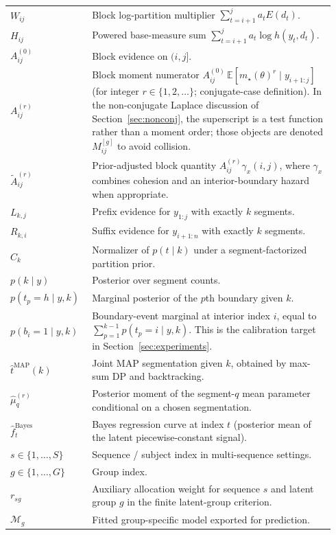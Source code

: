 \begin{longtable}{@{}p{0.22\linewidth}p{0.72\linewidth}@{}}
$W_{ij}$ & Block log-partition multiplier $\sum_{t=i+1}^j a_t E(d_t)$. \\
$H_{ij}$ & Powered base-measure sum $\sum_{t=i+1}^j a_t\log h(y_t,d_t)$. \\
$A^{(0)}_{ij}$ & Block evidence on $(i,j]$. \\
$A^{(r)}_{ij}$ & Block moment numerator $A^{(0)}_{ij}\,\mathbb{E}[m_\star(\theta)^r\mid y_{i+1:j}]$ (for integer $r\in\{1,2,\dots\}$; conjugate-case definition). In the non-conjugate Laplace discussion of Section~\ref{sec:nonconj}, the superscript is a test function rather than a moment order; those objects are denoted $M^{[g]}_{ij}$ to avoid collision. \\
$\widetilde A^{(r)}_{ij}$ & Prior-adjusted block quantity $A^{(r)}_{ij}\gamma_x(i,j)$, where $\gamma_x$ combines cohesion and an interior-boundary hazard when appropriate. \\
\midrule
$L_{k,j}$ & Prefix evidence for $y_{1:j}$ with exactly $k$ segments. \\
$R_{k,i}$ & Suffix evidence for $y_{i+1:n}$ with exactly $k$ segments. \\
$C_k$ & Normalizer of $p(t\mid k)$ under a segment-factorized partition prior. \\
$p(k\mid y)$ & Posterior over segment counts. \\
$p(t_p=h\mid y,k)$ & Marginal posterior of the $p$th boundary given $k$. \\
$p(b_i=1\mid y,k)$ & Boundary-event marginal at interior index $i$, equal to $\sum_{p=1}^{k-1} p(t_p=i\mid y,k)$. This is the calibration target in Section~\ref{sec:experiments}. \\
\midrule
$\widehat t^{\mathrm{MAP}}(k)$ & Joint MAP segmentation given $k$, obtained by max-sum DP and backtracking. \\
$\widehat\mu_q^{(r)}$ & Posterior moment of the segment-$q$ mean parameter conditional on a chosen segmentation. \\
$\widehat f_t^{\mathrm{Bayes}}$ & Bayes regression curve at index $t$ (posterior mean of the latent piecewise-constant signal). \\
\midrule
$s\in\{1,\dots,S\}$ & Sequence / subject index in multi-sequence settings. \\
$g\in\{1,\dots,G\}$ & Group index. \\
$r_{sg}$ & Auxiliary allocation weight for sequence $s$ and latent group $g$ in the finite latent-group criterion. \\
\midrule
$\mathcal{M}_g$ & Fitted group-specific model exported for prediction. \\

\end{longtable}
